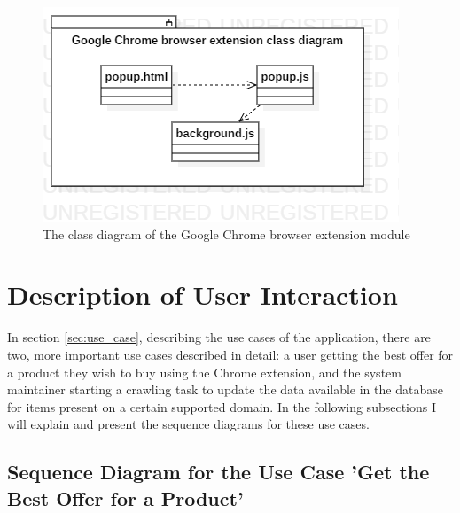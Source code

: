 \documentclass[12pt,a4paper,twoside]{report}
\begin{document}
\begin{figure}[ht]
  \centering
  \includegraphics[width=0.5\linewidth]{img/app_class_chrome_extension.png}
  \caption{The class diagram of the Google Chrome browser extension module}
  \label{fig:app_class_chrome_extension}
\end{figure}


\section{Description of User Interaction}

In section \ref{sec:use_case}, describing the use cases of the application, there are two, more important use cases described in detail: a user getting the best offer for a product they wish to buy using the Chrome extension, and the system maintainer starting a crawling task to update the data available in the database for items present on a certain supported domain. In the following subsections I will explain and present the sequence diagrams for these use cases.


\subsection{Sequence Diagram for the Use Case 'Get the Best Offer for a Product'}
\end{document}
